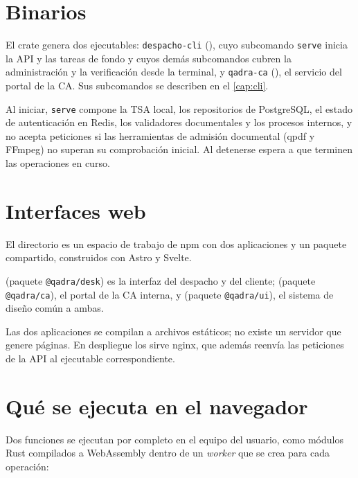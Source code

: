 \section{Binarios}\label{sec:arq-binarios}

El crate  genera dos ejecutables: \texttt{despacho-cli}
(), cuyo subcomando \texttt{serve} inicia la
API y las tareas de fondo y cuyos demás subcomandos cubren la administración
y la verificación desde la terminal, y \texttt{qadra-ca}
(), el servicio del portal de la CA. Sus
subcomandos se describen en el \cref{cap:cli}.

Al iniciar, \texttt{serve} compone la TSA local, los repositorios de
PostgreSQL, el estado de autenticación en Redis, los validadores documentales
y los procesos internos, y no acepta peticiones si las herramientas de
admisión documental (qpdf y FFmpeg) no superan su comprobación inicial. Al
detenerse espera a que terminen las operaciones en curso.

\section{Interfaces web}\label{sec:arq-web}

El directorio  es un espacio de trabajo de npm con dos aplicaciones y un
paquete compartido, construidos con Astro y Svelte.

 (paquete \texttt{@qadra/desk}) es la interfaz del
despacho y del cliente;  (paquete \texttt{@qadra/ca}),
el portal de la CA interna, y  (paquete
\texttt{@qadra/ui}), el sistema de diseño común a ambas.

Las dos aplicaciones se compilan a archivos estáticos; no existe un servidor
que genere páginas. En despliegue los sirve nginx, que además reenvía las
peticiones de la API al ejecutable correspondiente.

\section{Qué se ejecuta en el navegador}\label{sec:arq-navegador}

Dos funciones se ejecutan por completo en el equipo del usuario, como módulos
Rust compilados a WebAssembly dentro de un \emph{worker} que se crea para cada
operación:

